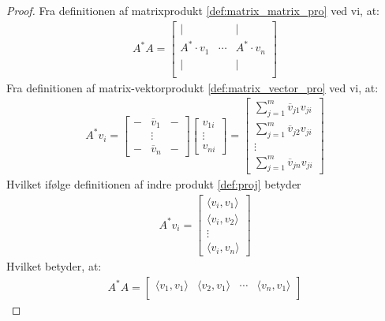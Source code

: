 \begin{proof}
    Fra definitionen af matrixprodukt \ref{def:matrix_matrix_pro} ved vi, at:
    \begin{gather}
        A^*A = 
        \begin{bmatrix}
            | &  & | \\
            A^* \cdot v_1 & \cdots & A^* \cdot v_n \\
            | &  & | \\
        \end{bmatrix}
    \end{gather}
    Fra definitionen af matrix-vektorprodukt \ref{def:matrix_vector_pro} ved vi, at:
    \begin{gather}
        A^* v_i = 
        \begin{bmatrix}
            - & \overline{v}_{1} & - \\ 
            &\vdots& \\
            - & \overline{v}_{n} & - 
        \end{bmatrix}
        \begin{bmatrix}
            v_{1i} \\ \vdots \\ v_{ni}
        \end{bmatrix}
        =
        \begin{bmatrix}
            \sum_{j=1}^{m} \overline{v}_{j1}v_{ji} \\
            \sum_{j=1}^{m} \overline{v}_{j2}v_{ji} \\
            \vdots \\
            \sum_{j=1}^{m} \overline{v}_{jn}v_{ji}
        \end{bmatrix}
    \end{gather}
    Hvilket ifølge definitionen af indre produkt \ref{def:proj} betyder 
    \begin{gather}
        A^* v_i = 
        \begin{bmatrix}
            \langle v_i, v_1 \rangle \\
            \langle v_i, v_2 \rangle \\
            \vdots \\
            \langle v_i, v_n \rangle
        \end{bmatrix}
    \end{gather}
    Hvilket betyder, at:
    \begin{gather}
        A^*A = 
        \begin{bmatrix}
            \langle v_1, v_1 \rangle & \langle v_2, v_1 \rangle & \cdots & \langle v_n, v_1 \rangle \\

\end{bmatrix}
\end{gather}
\end{proof}

